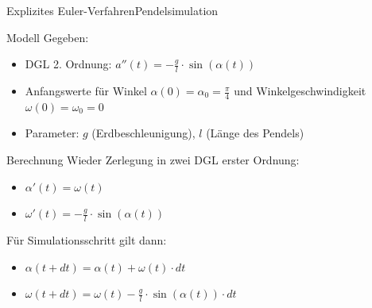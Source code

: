 \documentclass[xelatex,aspectratio=169]{beamer}
\begin{document}
\begin{frame}{Explizites Euler-Verfahren}{Pendelsimulation}
    \begin{block}{Modell}
        Gegeben:
        \begin{itemize}
            \item DGL 2. Ordnung: $a''(t) = -\frac{g}{l} \cdot \sin(\alpha(t))$
            \item Anfangswerte für Winkel $\alpha(0) = \alpha_0 = \frac{\pi}{4}$ und Winkelgeschwindigkeit $\omega(0) = \omega_0 = 0$
            \item Parameter: $g$ (Erdbeschleunigung), $l$ (Länge des Pendels)
        \end{itemize}
    \end{block}
    \begin{block}{Berechnung}
        Wieder Zerlegung in zwei DGL erster Ordnung:
        \begin{itemize}
            \item $\alpha'(t) = \omega(t)$
            \item $\omega'(t) = -\frac{g}{l} \cdot \sin(\alpha(t))$
        \end{itemize}
        Für Simulationsschritt gilt dann:
        \begin{itemize}
            \item $\alpha(t + dt) = \alpha(t) + \omega(t) \cdot dt$
            \item $\omega(t + dt) = \omega(t) - \frac{g}{l} \cdot \sin(\alpha(t)) \cdot dt$
        \end{itemize}
    \end{block}
\end{frame}
\end{document}

